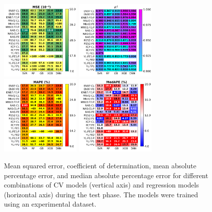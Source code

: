 \documentclass[10pt]{iopart}
\begin{document}
\begin{figure}
\centering
\includegraphics[width=0.35\textwidth]{Fig10a}
\includegraphics[width=0.35\textwidth]{Fig10b}
\includegraphics[width=0.35\textwidth]{Fig10c}
\includegraphics[width=0.35\textwidth]{Fig10d}
\caption{
Mean squared error, coefficient of determination, mean absolute percentage error, and median absolute percentage error
for different combinations of CV models (vertical axis) and regression models (horizontal axis)
during the test phase.
The models were trained using an experimental dataset.
}\label{Fig10}
\end{figure}
\end{document}
